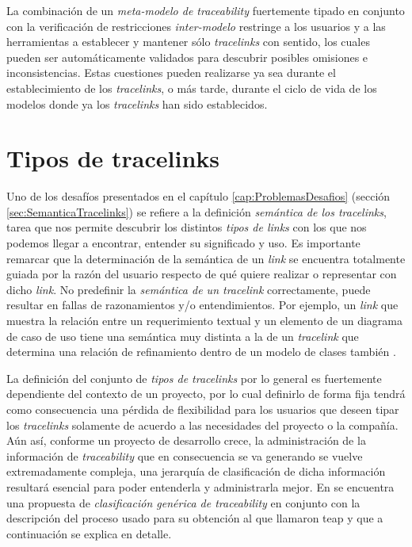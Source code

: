 \documentclass[a4paper,12pt,oneside,spanish]{book}
\begin{document}
La combinación de un \textit{meta-modelo de traceability} fuertemente tipado en conjunto con la verificación de restricciones \textit{inter-modelo} restringe a los usuarios y a las herramientas a establecer y mantener sólo \textit{tracelinks} con sentido, los cuales pueden ser automáticamente validados para descubrir posibles omisiones e inconsistencias. Estas cuestiones pueden realizarse ya sea durante el establecimiento de los \textit{tracelinks}, o más tarde, durante el ciclo de vida de los modelos donde ya los \textit{tracelinks} han sido establecidos.




\section{Tipos de tracelinks}

Uno de los desafíos presentados en el capítulo \ref{cap:ProblemasDesafios} (sección \ref{sec:SemanticaTracelinks}) se refiere a la definición  \textit{semántica de los tracelinks}, tarea que nos permite descubrir los distintos \textit{tipos de links} con los que nos podemos llegar a encontrar, entender su significado y uso. Es importante remarcar que la determinación de la semántica de un \textit{link} se encuentra totalmente guiada por la razón del usuario respecto de qué quiere realizar o representar con dicho \textit{link}. No predefinir la \textit{semántica de un tracelink} correctamente, puede resultar en fallas de razonamientos y/o entendimientos. Por ejemplo, un \textit{link} que muestra la relación entre un requerimiento textual y un elemento de un diagrama de caso de uso  tiene una semántica muy distinta a la de un \textit{tracelink} que determina una relación de refinamiento dentro de un modelo de clases también .

La definición del conjunto de \textit{tipos de tracelinks} por lo general es fuertemente dependiente del contexto de un proyecto, por lo cual definirlo de forma fija tendrá como consecuencia una pérdida de flexibilidad para los usuarios que deseen tipar los \textit{tracelinks} solamente de acuerdo a las necesidades del proyecto o la compañía. Aún así, conforme un proyecto de desarrollo crece, la administración de la información de \textit{traceability} que en consecuencia se va generando se vuelve extremadamente compleja, una jerarquía de clasificación de dicha información resultará esencial para poder entenderla y administrarla mejor. En \cite{PaigeOlsenKolovosZschalerPower} se encuentra una propuesta de \textit{clasificación genérica de traceability} en conjunto con la descripción del proceso usado para su obtención al que llamaron \gls{teap} y que a continuación se explica en detalle.
\end{document}
